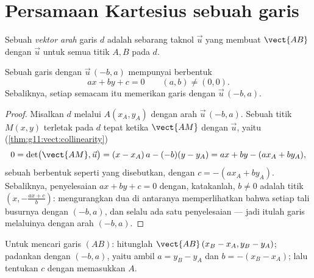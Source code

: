 \section{Persamaan Kartesius sebuah garis}

\begin{definition}\label{def:g11:vect:direction}
Sebuah \emph{vektor arah} garis $d$ adalah sebarang
 taknol $\vec u$ yang membuat $\vect{AB}$  dengan $\vec u$
untuk semua titik $A, B$ pada $d$.
\end{definition}

\begin{theorem}\label{thm:g11:vect:cartesian}
Sebuah garis dengan  $\vec u\,(-b, a)$ mempunyai 
berbentuk
\[
ax + by + c = 0
\qquad (a, b) \neq (0, 0).
\]
Sebaliknya, setiap  semacam itu memerikan garis dengan 
$\vec u\,(-b, a)$.
\end{theorem}

\begin{proof}
Misalkan $d$ melalui $A(x_A, y_A)$ dengan arah $\vec u\,(-b, a)$. Sebuah
titik $M(x, y)$ terletak pada $d$ tepat ketika $\vect{AM}$  dengan
$\vec u$, yaitu (\cref{thm:g11:vect:collinearity})
\[
0 = \det\bigl(\vect{AM}, \vec u\bigr)
= (x - x_A)\,a - (-b)(y - y_A)
= ax + by - (a x_A + b y_A),
\]
sebuah  berbentuk seperti yang disebutkan, dengan $c = -(a x_A + b y_A)$.
Sebaliknya, penyelesaian $ax + by + c = 0$ dengan, katakanlah, $b \neq 0$ adalah
titik $\left(x, -\frac{a x + c}{b}\right)$: mengurangkan dua di antaranya
memperlihatkan bahwa setiap tali busurnya  dengan $(-b, a)$, dan selalu
ada satu penyelesaian --- jadi itulah garis melaluinya dengan arah $(-b, a)$.
\end{proof}

\begin{method}\label{met:g11:vect:twopoints}
Untuk mencari  garis $(AB)$: hitunglah 
$\vect{AB}\,(x_B - x_A, y_B - y_A)$; padankan dengan $(-b, a)$, yaitu ambil
$a = y_B - y_A$ dan $b = -(x_B - x_A)$; lalu tentukan $c$ dengan memasukkan
 $A$.
\end{method}

